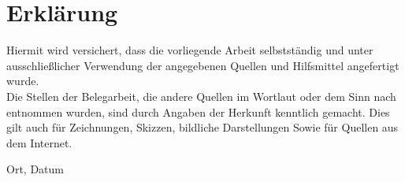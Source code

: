 \chapter*{Erkl\"arung}
\thispagestyle{empty}

Hiermit wird versichert, dass  die vorliegende Arbeit selbstst\"andig und unter ausschlie{\ss}licher Verwendung der angegebenen Quellen und Hilfsmittel angefertigt wurde.\\
\newline
Die Stellen der Belegarbeit, die andere Quellen im Wortlaut oder dem Sinn nach entnommen wurden, sind durch Angaben der Herkunft kenntlich gemacht. Dies gilt auch für Zeichnungen, Skizzen, bildliche Darstellungen Sowie für Quellen aus dem Internet.

\vspace{2cm}

\noindent
Ort, Datum
\hfill
{}




\vspace{3cm}


